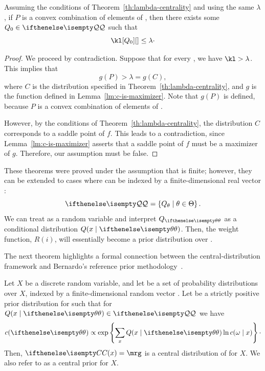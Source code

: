 \begin{lemma}
    \label{lm:imperfection}
    Assuming the conditions of Theorem~\ref{th:lambda-centrality} and using the same $\lambda$,
    if $P$ is a convex combination of elements of \setQ, then there exists some $Q_0 \in \setQ$ such that
    \begin{equation*}
        \kl[Q_0][] \leq \lambda \cdot
    \end{equation*}
\end{lemma}

\begin{proof}
    We proceed by contradiction.
    Suppose that for every , we have $\kl > \lambda$.
    This implies that
    \[
        g(P) > \lambda = g(C),
    \]
    where $C$ is the distribution specified in Theorem~\ref{th:lambda-centrality}, and $g$ is the function defined in
    Lemma~\ref{lm:c-is-maximizer}.
    Note that $g(P)$ is defined, because $P$ is a convex combination of elements of \setQ.

    However, by the conditions of Theorem~\ref{th:lambda-centrality}, the distribution $C$ corresponds to a saddle
    point of $f$.
    This leads to a contradiction, since Lemma~\ref{lm:c-is-maximizer} asserts that a saddle point of $f$ must be a
    maximizer of $g$.
    Therefore, our assumption must be false.
\end{proof}

These theorems were proved under the assumption that \setQ is finite; however, they can be extended to cases where
\setQ can be indexed by a finite-dimensional real vector \param:
\[
    \setQ = \left\{ Q_{\theta} \mid \theta \in \Theta \right\}.
\]
We can treat \param as a random variable and interpret $Q_{\paramVal}$ as a conditional
distribution $Q(\xIt)$.
Then, the weight function, $R(i)$, will essentially become a prior distribution over \paramVal.

The next theorem highlights a formal connection between the central-distribution framework and Bernardo’s reference
prior methodology~\cite{BERNARDO200517}.

\begin{theorem}
    Let $X$ be a discrete random variable, and let \setQ be a set of probability distributions over $X$, indexed by a
    finite-dimensional random vector \param.
    Let \cPrior be a strictly positive prior distribution for \param such that for $\like(\xIt) \in \setQ$ we have
    \begin{equation}
        \label{eq:central-prior}
        \cPrior(\paramVal) \propto \exp \left\{  \sum_{x} \like(\xIt) \ln \cPrior(\tIx) \right\} \cdot
    \end{equation}
    Then, $\cDist(x) = \mrg$ is a central distribution of \setQ for $X$.
    We also refer to \cPrior as a central prior for $X$.
\end{theorem}


